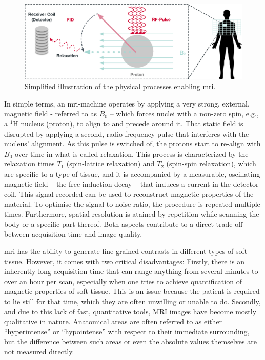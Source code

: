 \begin{figure}[b]
    \centering
    \includegraphics[width=\textwidth]{figures/mri.eps}
    \caption{Simplified illustration of the physical processes enabling \acrshort{mri}.}
    \label{figure:mri}
\end{figure}

In simple terms, an \acrshort{mri}-machine operates by applying a very strong, external, magnetic field - referred to as $B_0$ -- which forces nuclei with a non-zero spin, e.g., a $^{1}\text{H}$ nucleus (proton), to align to and precede around it. That static field is disrupted by applying a second, radio-frequency pulse that interferes with the nucleus' alignment. As this pulse is switched of, the protons start to re-align with $B_0$ over time in what is called relaxation. This process is characterized by the relaxation times $T_1$ (spin-lattice relaxation) and $T_2$ (spin-spin relaxation), which are specific to a type of tissue, and it is accompanied by a measurable, oscillating magnetic field -- the free induction decay --  that induces a current in the detector coil. This signal recorded can be used to reconstruct magnetic properties of the material. To optimise the signal to noise ratio, the procedure is repeated multiple times. Furthermore, spatial resolution is atained by repetition while scanning the body or a specific part thereof. Both aspects contribute to a direct trade-off between acquisition time and image quality.

\acrshort{mri} has the ability to generate fine-grained contrasts in different types of soft tissue. However, it comes with two critical disadvantages: Firstly, there is an inherently long acquisition time that can range anything from several minutes to over an hour per scan, especially when one tries to achieve quantification of magnetic properties of soft tissue. This is an issue because the patient is required to lie still for that time, which they are often unwilling or unable to do. Secondly, and due to this lack of fast, quantitative tools, MRI images have become mostly qualitative in nature. Anatomical areas are often referred to as either ``hyperintense'' or ``hypointense'' with respect to their immediate surrounding, but the difference between such areas or even the absolute values themselves are not measured directly.

